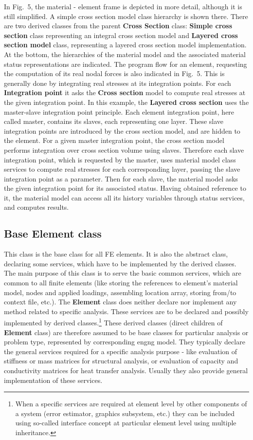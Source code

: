 \documentclass[a4paper]{article}
\newcommand{\class}[1]{{\bf #1}}
\begin{document}
In Fig.~5, the material - element frame is
depicted in more detail, although it is still simplified. A simple cross
section model class hierarchy is shown there. There are two 
derived classes from the parent \class{Cross Section} class: \class{Simple cross section}
class representing an integral cross section model and \class{Layered cross
section model} class, representing a layered cross section model
implementation. At the bottom,  the hierarchies of the material model and
the associated material status representations are indicated.
The program flow for an element, requesting the computation of its real nodal forces is also
indicated in Fig.~5. This is generally done by integrating real stresses at its integration
points. For each \class{Integration point} it asks the \class{Cross section} model to
compute real stresses at the given integration point. In this example,
the \class{Layered cross section} uses the master-slave integration point
principle. Each element integration point, here called master,
contains its slaves, each representing one layer. These slave
integration points are introduced by the cross section model, and are
hidden to the element. For a given master integration point, the cross section
model performs integration  over cross section
volume using slaves. Therefore  each slave integration point, which is requested
by the master, uses material model class services to compute real
stresses for each corresponding layer, passing the slave integration point as
a parameter. Then for each slave, the material model asks the given integration
point for its associated status.  Having obtained reference to it,
the material model can access all its history variables through status
services, and computes results.

\subsection{Base Element class}
This class is the base class for all FE elements. It is also the
abstract class, declaring some services, which have to be implemented
by the derived classes. The main purpose of this class is to serve the
basic common services, which are common to all finite elements (like
storing the references to element's material model, nodes and applied
loadings, assembling location array, storing
from/to context file, etc.). The \class{Element} class does neither declare nor
implement any method related to specific analysis. These services are to be declared
and possibly implemented by derived classes.\footnote{
When a specific services are required at element level by other
components of a system (error estimator, graphics subsystem, etc.)
they can be included using so-called interface concept at particular
element level using  multiple inheritance.} These derived classes
(direct children of \class{Element} class) are therefore assumed to be base
classes for particular analysis or problem type, represented by
corresponding engng model. They typically
declare the general services required for a specific analysis purpose
- like evaluation of stiffness or mass matrices for structural
analysis, or evaluation of capacity and conductivity matrices for heat
transfer analysis. Usually they also provide general implementation of
these services.
\end{document}
